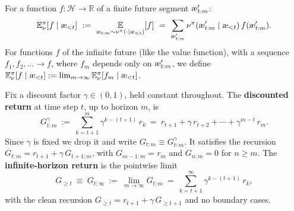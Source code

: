 \documentclass[fontsize=11pt, parskip=half]{scrartcl}
\newcommand{\cH}{\mathcal{H}}
\newcommand{\Ex}{\mathbb{E}}
\newcommand{\aes}{\textnormal{\ae}}
\begin{document}
\begin{definition}[Expectation $\Ex_\nu^\pi$]\label{def:expectation}
For a function $f : \cH \to \mathbb{R}$ of a finite future segment $\aes'_{t:m}$:
\[
    \Ex_\nu^\pi[f \mid \aes_{<t}]
    ~:=~ \underset{\aes_{t:m} \sim \nu^\pi(\cdot \mid \aes_{<t})}{\Ex} [f]
    ~=~ \sum_{\aes'_{t:m}} \nu^\pi(\aes'_{t:m} \mid \aes_{<t})\, f(\aes'_{t:m}).
\]
For functions $f$ of the infinite future (like the value function), with a sequence $f_1, f_2, \ldots \to f$, where $f_m$ depends only on $\aes'_{t:m}$, we define $\Ex_\nu^\pi[f \mid \aes_{<t}] := \lim_{m \to \infty} \Ex_\nu^\pi[f_m \mid \aes_{<t}]$.
\end{definition}

\begin{definition}\label{def:return}
Fix a discount factor $\gamma \in (0,1)$, held constant throughout.
The \textbf{discounted return} at time step $t$, up to horizon $m$, is
\[
    G^\gamma_{t:m}
    ~:=~ \sum_{k=t+1}^{m} \gamma^{k-(t+1)}\, r_k
    ~=~ r_{t+1} + \gamma\, r_{t+2} + \cdots + \gamma^{m-t}\, r_m.
\]
Since $\gamma$ is fixed we drop it and write $G_{t:m} \equiv G^\gamma_{t:m}$.
It satisfies the recursion $G_{t:m} = r_{t+1} + \gamma\, G_{t+1:m}$, with $G_{m-1:m} = r_m$ and $G_{n:m} = 0$ for $n \geq m$.
The \textbf{infinite-horizon return} is the pointwise limit
\[
    G_{\geq t} ~\equiv~ G_{t:\infty} ~:=~ \lim_{m \to \infty} G_{t:m} ~=~ \sum_{k=t+1}^{\infty} \gamma^{k-(t+1)}\, r_k,
\]
with the clean recursion $G_{\geq t} = r_{t+1} + \gamma\, G_{\geq t+1}$ and no boundary cases.
\end{definition}
\end{document}
